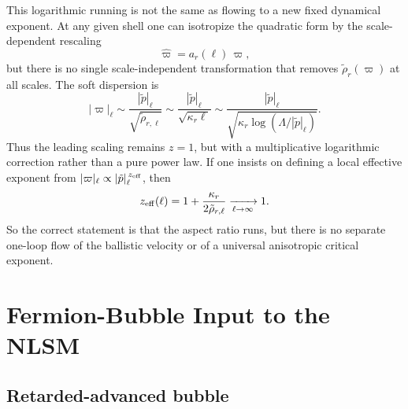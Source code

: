 \documentclass[aps,prx,preprint,amsmath,amssymb]{revtex4-2}
\begin{document}
This logarithmic running is not the same as flowing to a new fixed dynamical
exponent.  At any given shell one can isotropize the quadratic form by the
scale-dependent rescaling
\[
\hat\varpi = a_r(\ell)\,\varpi,
\]
but there is no single scale-independent transformation that removes
\(\tilde\rho_r(\varpi)\) at all scales.  The soft dispersion is
\begin{equation}\label{eq:generic-r-soft-dispersion}
|\varpi|_\ell
\sim
\frac{|\tilde p|_\ell}{\sqrt{\tilde\rho_{r,\ell}}}
\sim
\frac{|\tilde p|_\ell}{\sqrt{\kappa_r\ell}}
\sim
\frac{|\tilde p|_\ell}
{\sqrt{\kappa_r\log(\Lambda/|\tilde p|_\ell)}}.
\end{equation}
Thus the leading scaling remains \(z=1\), but with a multiplicative logarithmic
correction rather than a pure power law.  If one insists on defining a local
effective exponent from \(|\varpi|_\ell\propto |\tilde p|_\ell^{\,z_{\rm eff}}\),
then
\begin{equation}
z_{\rm eff}(\ell)
=
1+\frac{\kappa_r}{2\tilde\rho_{r,\ell}}
\xrightarrow[\ell\to\infty]{}1.
\end{equation}
So the correct statement is that the aspect ratio runs, but there is no
separate one-loop flow of the ballistic velocity or of a universal anisotropic
critical exponent.

\appendix

\section{Fermion-Bubble Input to the NLSM}
\label{app:bubble-appendix}

\subsection{Retarded-advanced bubble}
\label{app:ra-bubble}
\end{document}

